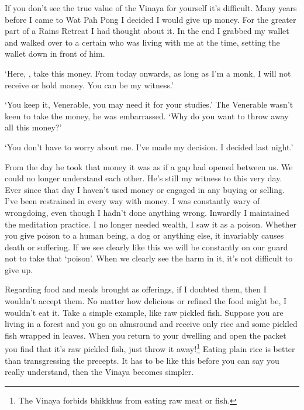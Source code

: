 If you don't see the true value of the Vinaya for yourself it's difficult. Many years before I came to Wat Pah Pong I decided I would give up money. For the greater part of a Rains Retreat I had thought about it. In the end I grabbed my wallet and walked over to a certain  who was living with me at the time, setting the wallet down in front of him. 

`Here, , take this money. From today onwards, as long as I'm a monk, I will not receive or hold money. You can be my witness.' 

`You keep it, Venerable, you may need it for your studies.' The Venerable  wasn't keen to take the money, he was embarrassed. `Why do you want to throw away all this money?' 

`You don't have to worry about me. I've made my decision. I decided last night.' 

From the day he took that money it was as if a gap had opened between us. We could no longer understand each other. He's still my witness to this very day. Ever since that day I haven't used money or engaged in any buying or selling. I've been restrained in every way with money. I was constantly wary of wrongdoing, even though I hadn't done anything wrong. Inwardly I maintained the meditation practice. I no longer needed wealth, I saw it as a poison. Whether you give poison to a human being, a dog or anything else, it invariably causes death or suffering. If we see clearly like this we will be constantly on our guard not to take that `poison'. When we clearly see the harm in it, it's not difficult to give up. 

Regarding food and meals brought as offerings, if I doubted them, then I wouldn't accept them. No matter how delicious or refined the food might be, I wouldn't eat it. Take a simple example, like raw pickled fish. Suppose you are living in a forest and you go on almsround and receive only rice and some pickled fish wrapped in leaves. When you return to your dwelling and open the packet you find that it's raw pickled fish, just throw it away!\footnote{The Vinaya forbids bhikkhus from eating raw meat or fish.} Eating plain rice is better than transgressing the precepts. It has to be like this before you can say you really understand, then the Vinaya becomes simpler. 

